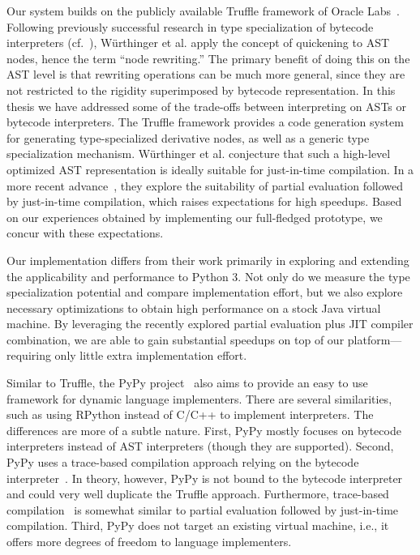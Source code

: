 Our system builds on the publicly available Truffle framework of Oracle Labs~\cite{Wurthinger+12}.
Following previously successful research in type specialization of bytecode interpreters (cf.~\cite{Brunthaler2010inca,Brunthaler2010quickening,williams.etal+10}), W\"{u}rthinger et al. apply the concept of quickening to AST nodes, hence the term ``node rewriting.''
The primary benefit of doing this on the AST level is that rewriting operations can be much more general, since they are not restricted to the rigidity superimposed by bytecode representation.
In this thesis we have addressed some of the trade-offs between interpreting on ASTs or bytecode interpreters.
The Truffle framework provides a code generation system for generating type-specialized derivative nodes, as well as a generic type specialization mechanism.
W\"{u}rthinger et al. conjecture that such a high-level optimized AST representation is ideally suitable for just-in-time compilation.
In a more recent advance~\cite{Wurthinger+13}, they explore the suitability of partial evaluation followed by just-in-time compilation, which raises expectations for high speedups.
Based on our experiences obtained by implementing our full-fledged prototype, we concur with these expectations.

Our implementation differs from their work primarily in exploring and extending the applicability and performance to Python 3.
Not only do we measure the type specialization potential and compare implementation effort, but we also explore necessary optimizations to obtain high performance on a stock Java virtual machine.
By leveraging the recently explored partial evaluation plus JIT compiler combination,
we are able to gain substantial speedups on top of our platform---requiring only little extra implementation effort.

Similar to Truffle, the PyPy project~\cite{Rigo2006} also aims to provide an easy to use framework for dynamic language implementers.
There are several similarities, such as using RPython instead of C/C++ to implement interpreters.
The differences are more of a subtle nature.
First, PyPy mostly  focuses on bytecode interpreters instead of AST interpreters (though they are supported).
Second, PyPy uses a trace-based compilation approach relying on the bytecode interpreter~\cite{bolz.etal09}.
In theory, however, PyPy is not bound to the bytecode interpreter and could very well duplicate the Truffle approach.
Furthermore, trace-based compilation~\cite{gal.etal+09,chang.etal+09,bebenita.etal+10,bebenita.etal+09,Bebenita+cil+2010,wimmer.etal+09,Inoue+2011,Inoue+2012} is somewhat similar to partial evaluation followed by just-in-time compilation.
Third, PyPy does not target an existing virtual machine, i.e., it offers more degrees of freedom to language implementers.

